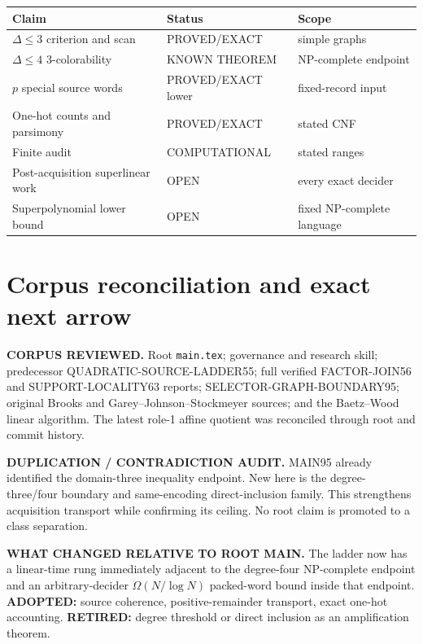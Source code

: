 \documentclass[11pt]{article}
\begin{document}
\begin{center}
\begin{tabular}{lll}
\toprule
Claim & Status & Scope\\
\midrule
\(\Delta\le3\) criterion and scan & PROVED/EXACT & simple graphs\\
\(\Delta\le4\) 3-colorability & KNOWN THEOREM & NP-complete endpoint\\
\(p\) special source words & PROVED/EXACT lower & fixed-record input\\
One-hot counts and parsimony & PROVED/EXACT & stated CNF\\
Finite audit & COMPUTATIONAL & stated ranges\\
Post-acquisition superlinear work & OPEN & every exact decider\\
Superpolynomial lower bound & OPEN & fixed NP-complete language\\
\bottomrule
\end{tabular}
\end{center}

\section{Corpus reconciliation and exact next arrow}
\textbf{CORPUS REVIEWED.} Root \texttt{main.tex}; governance and research
skill; predecessor QUADRATIC-SOURCE-LADDER55; full verified FACTOR-JOIN56 and
SUPPORT-LOCALITY63 reports; SELECTOR-GRAPH-BOUNDARY95; original Brooks and
Garey--Johnson--Stockmeyer sources; and the Baetz--Wood linear algorithm. The
latest role-1 affine quotient was reconciled through root and commit history.

\textbf{DUPLICATION / CONTRADICTION AUDIT.} MAIN95 already identified the
domain-three inequality endpoint. New here is the degree-three/four boundary
and same-encoding direct-inclusion family. This strengthens acquisition
transport while confirming its ceiling. No root claim is promoted to a class
separation.

\textbf{WHAT CHANGED RELATIVE TO ROOT MAIN.} The ladder now has a linear-time
rung immediately adjacent to the degree-four NP-complete endpoint and an
arbitrary-decider \(\Omega(N/\log N)\) packed-word bound inside that endpoint.
\textbf{ADOPTED:} source coherence, positive-remainder transport, exact
one-hot accounting. \textbf{RETIRED:} degree threshold or direct inclusion as
an amplification theorem.
\end{document}
